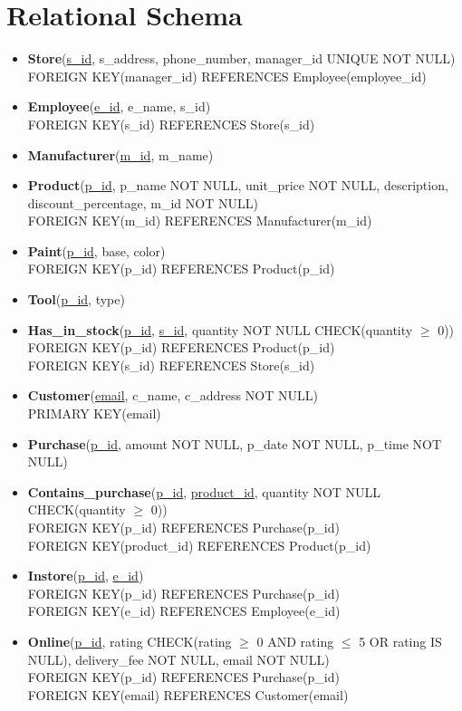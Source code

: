 \documentclass[a4paper,11pt]{article}
\begin{document}
\section{Relational Schema}
\begin{itemize}
    \item \textbf{Store}(\underline{s\_id}, s\_address, phone\_number, manager\_id UNIQUE NOT NULL)\\
        FOREIGN KEY(manager\_id) REFERENCES Employee(employee\_id)
    \item \textbf{Employee}(\underline{e\_id}, e\_name, s\_id)\\
        FOREIGN KEY(s\_id) REFERENCES Store(s\_id)
    \item \textbf{Manufacturer}(\underline{m\_id}, m\_name)
    \item \textbf{Product}(\underline{p\_id}, p\_name NOT NULL, unit\_price NOT NULL, description,\\ discount\_percentage, m\_id NOT NULL)\\
        FOREIGN KEY(m\_id) REFERENCES Manufacturer(m\_id)
    \item \textbf{Paint}(\underline{p\_id}, base, color)\\
        FOREIGN KEY(p\_id) REFERENCES Product(p\_id)
    \item \textbf{Tool}(\underline{p\_id}, type)
    \item \textbf{Has\_in\_stock}(\underline{p\_id}, \underline{s\_id}, quantity NOT NULL CHECK(quantity $\geq$ 0))\\
        FOREIGN KEY(p\_id) REFERENCES Product(p\_id)\\
        FOREIGN KEY(s\_id) REFERENCES Store(s\_id)
    \item \textbf{Customer}(\underline{email}, c\_name, c\_address NOT NULL)\\
        PRIMARY KEY(email)
    \item \textbf{Purchase}(\underline{p\_id}, amount NOT NULL, p\_date NOT NULL, p\_time NOT NULL)
    \item \textbf{Contains\_purchase}(\underline{p\_id}, \underline{product\_id}, quantity NOT NULL CHECK(quantity $\geq$ 0))\\
        FOREIGN KEY(p\_id) REFERENCES Purchase(p\_id)\\
        FOREIGN KEY(product\_id) REFERENCES Product(p\_id)
    \item \textbf{Instore}(\underline{p\_id}, \underline{e\_id})\\
        FOREIGN KEY(p\_id) REFERENCES Purchase(p\_id)\\
        FOREIGN KEY(e\_id) REFERENCES Employee(e\_id)
    \item \textbf{Online}(\underline{p\_id}, rating CHECK(rating $\geq$ 0 AND rating $\leq$ 5 OR rating IS NULL), delivery\_fee NOT NULL, email NOT NULL)\\
        FOREIGN KEY(p\_id) REFERENCES Purchase(p\_id)\\
        FOREIGN KEY(email) REFERENCES Customer(email)


\end{itemize}
\end{document}
